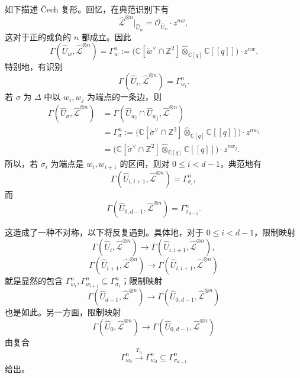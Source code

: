 如下描述 \v{C}ech 复形。回忆，在典范识别下有
\[
\widehat{\mathcal L}^{\otimes n}|_{\widehat U_w}
=\mathcal O_{\widehat U_w}\cdot z^{nw},
\]
这对于正的或负的 $n$ 都成立。因此
\[
\Gamma(\widehat U_w,\widehat{\mathcal L}^{\otimes n})
=\Gamma_w^n
:=\bigl(\mathbb C[\check w^\vee\cap\mathbb Z^2]
\widehat\otimes_{\mathbb C[q]}\mathbb C[[q]]\bigr)\cdot z^{nw}.
\]
特别地，有识别
\setcounter{equation}{19}
\begin{equation}\label{eq:8.20}
\Gamma(\widehat U_i,\widehat{\mathcal L}^{\otimes n})=\Gamma_{w_i}^n.
\end{equation}
若 $\sigma$ 为 $\Delta$ 中以 $w_i,w_j$ 为端点的一条边，则
\[
\begin{aligned}
\Gamma(\widehat U_\sigma,\widehat{\mathcal L}^{\otimes n})
&=\Gamma(\widehat U_{w_i}\cap\widehat U_{w_j},\widehat{\mathcal L}^{\otimes n})\\
&=\Gamma_\sigma^n
:=\bigl(\mathbb C[\check\sigma^\vee\cap\mathbb Z^2]
\widehat\otimes_{\mathbb C[q]}\mathbb C[[q]]\bigr)\cdot z^{nw_i}\\
&=\bigl(\mathbb C[\check\sigma^\vee\cap\mathbb Z^2]
\widehat\otimes_{\mathbb C[q]}\mathbb C[[q]]\bigr)\cdot z^{nw_j}.
\end{aligned}
\]
所以，若 $\sigma_i$ 为端点是 $w_i,w_{i+1}$ 的区间，则对 $0\leq i<d-1$，典范地有
\begin{equation}\label{eq:8.21}
\Gamma(\widehat U_{i,i+1},\widehat{\mathcal L}^{\otimes n})=\Gamma_{\sigma_i}^n,
\end{equation}
而
\begin{equation}\label{eq:8.22}
\Gamma(\widehat U_{0,d-1},\widehat{\mathcal L}^{\otimes n})=\Gamma_{\sigma_{d-1}}^n.
\end{equation}

这造成了一种不对称，以下将反复遇到。具体地，对于 $0\leq i<d-1$，限制映射
\[
\Gamma(\widehat U_i,\widehat{\mathcal L}^{\otimes n})
\longrightarrow\Gamma(\widehat U_{i,i+1},\widehat{\mathcal L}^{\otimes n}),
\]
\[
\Gamma(\widehat U_{i+1},\widehat{\mathcal L}^{\otimes n})
\longrightarrow\Gamma(\widehat U_{i,i+1},\widehat{\mathcal L}^{\otimes n})
\]
就是显然的包含 $\Gamma_{w_i}^n,\Gamma_{w_{i+1}}^n\subseteq\Gamma_{\sigma_i}^n$；限制映射
\[
\Gamma(\widehat U_{d-1},\widehat{\mathcal L}^{\otimes n})
\longrightarrow\Gamma(\widehat U_{0,d-1},\widehat{\mathcal L}^{\otimes n})
\]
也是如此。另一方面，限制映射
\[
\Gamma(\widehat U_0,\widehat{\mathcal L}^{\otimes n})
\longrightarrow\Gamma(\widehat U_{0,d-1},\widehat{\mathcal L}^{\otimes n})
\]
由复合
\[
\Gamma_{w_0}^n\xrightarrow{T_n}\Gamma_{w_d}^n
\subseteq\Gamma_{\sigma_{d-1}}^n
\]
给出。

